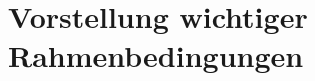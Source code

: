 \documentclass[a4paper,
DIV=13,
12pt,
BCOR=10mm,
department=FakIM,
oneside,
parskip=half,
automark,
listof=totocnumbered,
bibliography=totocnumbered,
acronym=totocnumbered
] {OTHRartcl}
\begin{document}
\section{Vorstellung wichtiger Rahmenbedingungen}



\end{document}
